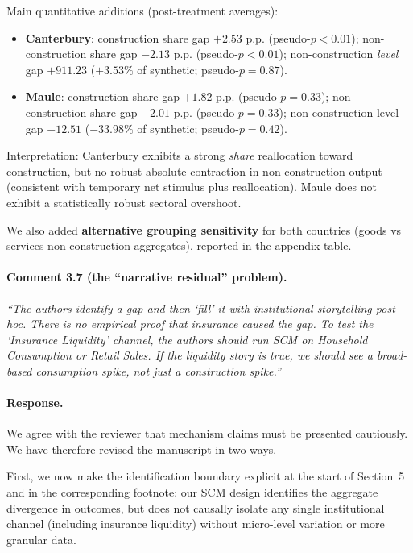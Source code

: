 Main quantitative additions (post-treatment averages):
\begin{itemize}
  \item \textbf{Canterbury}: construction share gap \(+2.53\) p.p. (pseudo-\(p<0.01\)); non-construction share gap \(-2.13\) p.p. (pseudo-\(p<0.01\)); non-construction \emph{level} gap \(+911.23\) (\(+3.53\%\) of synthetic; pseudo-\(p=0.87\)).
  \item \textbf{Maule}: construction share gap \(+1.82\) p.p. (pseudo-\(p=0.33\)); non-construction share gap \(-2.01\) p.p. (pseudo-\(p=0.33\)); non-construction level gap \(-12.51\) (\(-33.98\%\) of synthetic; pseudo-\(p=0.42\)).
\end{itemize}

Interpretation: Canterbury exhibits a strong \emph{share} reallocation toward construction, but no robust absolute contraction in non-construction output (consistent with temporary net stimulus plus reallocation). Maule does not exhibit a statistically robust sectoral overshoot.

We also added \textbf{alternative grouping sensitivity} for both countries (goods vs services non-construction aggregates), reported in the appendix table.

\paragraph{Comment 3.7 (the ``narrative residual'' problem).}
\textit{``The authors identify a gap and then `fill' it with institutional storytelling post-hoc. There is no empirical proof that insurance caused the gap. To test the `Insurance Liquidity' channel, the authors should run SCM on Household Consumption or Retail Sales. If the liquidity story is true, we should see a broad-based consumption spike, not just a construction spike.''}

\paragraph{Response.}
We agree with the reviewer that mechanism claims must be presented cautiously. We have therefore revised the manuscript in two ways.

First, we now make the identification boundary explicit at the start of Section~5 and in the corresponding footnote: our SCM design identifies the aggregate divergence in outcomes, but does not causally isolate any single institutional channel (including insurance liquidity) without micro-level variation or more granular data.

